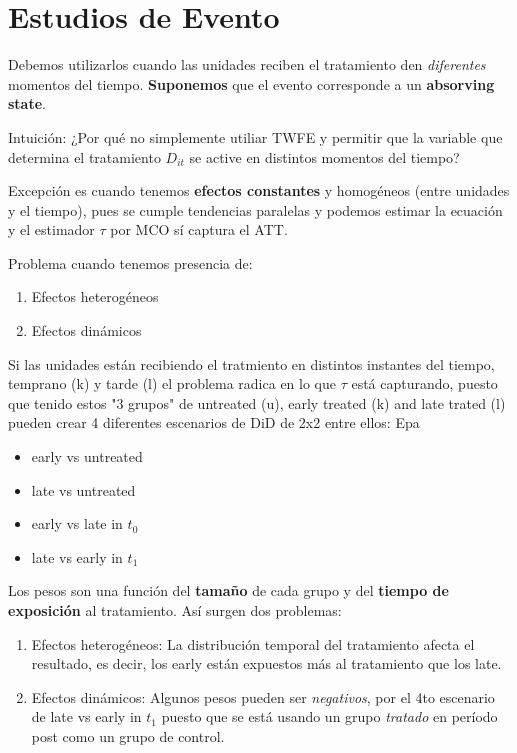 \documentclass[11pt, twocolumn]{article}
\begin{document}
\section{Estudios de Evento}
Debemos utilizarlos cuando las unidades reciben el tratamiento den \textit{diferentes} momentos del tiempo. \textbf{Suponemos} que el evento corresponde a un \textbf{absorving state}.

Intuición: ¿Por qué no simplemente utiliar TWFE y permitir que la variable que determina el tratamiento $D_{it}$ se active en distintos momentos del tiempo?

Excepción es cuando tenemos \textbf{efectos constantes} y homogéneos (entre unidades y el tiempo), pues se cumple tendencias paralelas y podemos estimar la ecuación y el estimador $\tau$ por MCO sí captura el ATT.

Problema cuando tenemos presencia de: 
\begin{enumerate}
    \item Efectos heterogéneos
    \item Efectos dinámicos
\end{enumerate}

Si las unidades están recibiendo el tratmiento en distintos instantes del tiempo, temprano (k) y tarde (l) el problema radica en lo que $\tau$ está capturando, puesto que tenido estos "3 grupos" de untreated (u), early treated (k) and late trated (l) pueden crear 4 diferentes escenarios de DiD de 2x2 entre ellos:
Epa
\begin{multicols}{2}
\begin{itemize}
\item early vs untreated
\item late vs untreated
\item early vs late in $t_0$ 
\item late vs early in $t_1$
\end{itemize}
\end{multicols}

Los pesos son una función del \textbf{tamaño} de cada grupo y del \textbf{tiempo de exposición} al tratamiento. Así surgen dos problemas:
\begin{enumerate}
 \item Efectos heterogéneos: La distribución temporal del tratamiento afecta el resultado, es decir, los early están expuestos más al tratamiento que los late. 
 \item Efectos dinámicos: Algunos pesos pueden ser \textit{negativos}, por el 4to escenario de late vs early in $t_1$ puesto que se está usando un grupo \textit{tratado} en período post como un grupo de control. 

 \end{enumerate}
\end{document}
